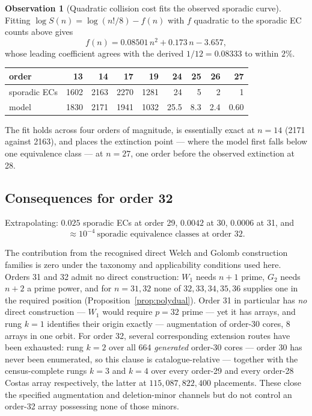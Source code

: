 \documentclass[11pt,a4paper]{article}
\theoremstyle{definition}
\newtheorem{observation}[theorem]{Observation}
\begin{document}
\begin{observation}[Quadratic collision cost fits the observed sporadic curve]
\label{obs:extinction}
Fitting $\log S(n) = \log(n!/8) - f(n)$ with $f$ quadratic to the sporadic EC
counts above gives
\[
f(n) = 0.08501\,n^2 + 0.173\,n - 3.657,
\]
whose leading coefficient agrees with the derived $1/12 = 0.08333$ to within
$2\%$.
\end{observation}

\begin{center}
\begin{tabular}{@{}lrrrrrrrr@{}}
\toprule
order & 13 & 14 & 17 & 19 & 24 & 25 & 26 & 27 \\
\midrule
sporadic ECs & 1602 & 2163 & 2270 & 1281 & 24 & 5 & 2 & 1 \\
model & 1830 & 2171 & 1941 & 1032 & 25.5 & 8.3 & 2.4 & 0.60 \\
\bottomrule
\end{tabular}
\end{center}

The fit holds across four orders of magnitude, is essentially exact at $n=14$
(2171 against 2163), and places the extinction point --- where the model first
falls below one equivalence class --- at $n=27$, one order before the observed
extinction at 28.

\subsection{Consequences for order 32}

Extrapolating: $0.025$ sporadic ECs at order 29, $0.0042$ at 30, $0.0006$ at 31,
and
\[
\boxed{\;\approx 10^{-4}\ \text{sporadic equivalence classes at order }32.\;}
\]

The contribution from the recognised direct Welch and Golomb construction
families is zero under the taxonomy and applicability conditions used here.
Orders 31 and 32 admit no direct construction: $W_1$ needs $n+1$ prime, $G_2$ needs $n+2$ a prime power, and for
$n=31,32$ none of $32,33,34,35,36$ supplies one in the required position
(Proposition~\ref{prop:polydual}). Order 31 in particular has \emph{no} direct
construction --- $W_1$ would require $p=32$ prime --- yet it has arrays, and rung
$k=1$ identifies their origin exactly --- augmentation of order-30 cores, 8
arrays in one orbit. For order 32, several corresponding extension routes have
been exhausted: rung $k=2$ over all 664 \emph{generated} order-30 cores --- order
30 has never been enumerated, so this clause is catalogue-relative --- together
with the census-complete rungs $k=3$ and $k=4$ over every order-29 and every
order-28 Costas array respectively, the latter at $115{,}087{,}822{,}400$
placements. These close the specified augmentation and deletion-minor channels
but do not control an order-32 array possessing none of those minors.
\end{document}
